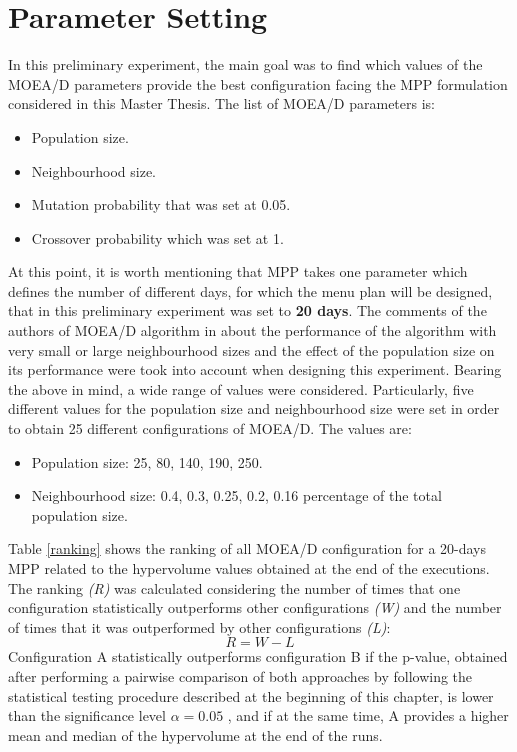\section{Parameter Setting}
In this preliminary experiment, the main goal was to find which values of the MOEA/D\cite{Zhang2007} parameters provide the best configuration facing the MPP formulation considered in this Master Thesis. The list of MOEA/D parameters is:
\begin{itemize}
    \item Population size.
    \item Neighbourhood size.
    \item Mutation probability that was set at 0.05.
    \item Crossover probability which was set at 1.
\end{itemize}
At this point, it is worth mentioning that MPP takes one parameter which defines the number of different days, for which the menu plan will be designed, that in this preliminary experiment was set to \textbf{20 days}. 
The comments of the authors of MOEA/D algorithm in \cite{Zhang2007} about the performance of the algorithm with very small or large neighbourhood sizes and the effect of the population size on its performance were took into account when designing this experiment. Bearing the above in mind, a wide range of values were considered. Particularly, five different values for the population size and neighbourhood size were set in order to obtain 25 different configurations of MOEA/D. The values are:
\begin{itemize}
    \item Population size: 25, 80, 140, 190, 250.
    \item Neighbourhood size: 0.4, 0.3, 0.25, 0.2, 0.16 percentage of the total population size.
\end{itemize}
Table \ref{ranking} shows the ranking of all MOEA/D configuration for a 20-days MPP related to the hypervolume values obtained at the end of the executions. The ranking \textit{(R)} was calculated considering the number of times that one configuration statistically outperforms other configurations \textit{(W)} and the number of times that it was outperformed by other configurations \textit{(L)}: 
\[ 
R = W - L
\]
Configuration A statistically outperforms configuration B if the p-value, obtained after performing a pairwise comparison of both approaches by following the statistical testing procedure described at the beginning of this chapter, is lower than the significance level $\alpha = 0.05$ , and if at the same time, A provides a higher mean and median of the hypervolume at the end of the runs.

